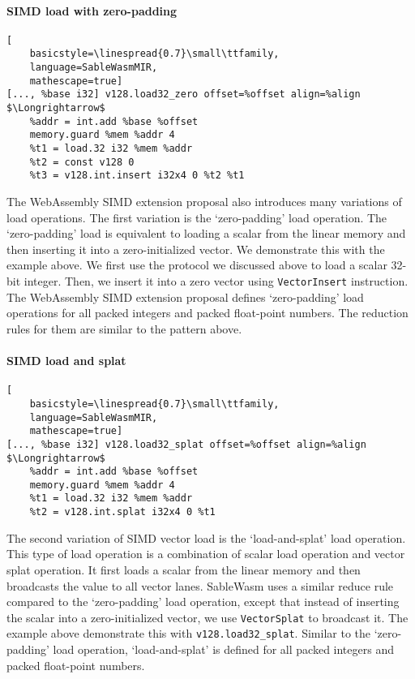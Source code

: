 \paragraph{SIMD load with zero-padding} \quad
\begin{lstlisting}[
    basicstyle=\linespread{0.7}\small\ttfamily, 
    language=SableWasmMIR, 
    mathescape=true]
[..., %base i32] v128.load32_zero offset=%offset align=%align $\Longrightarrow$
    %addr = int.add %base %offset
    memory.guard %mem %addr 4
    %t1 = load.32 i32 %mem %addr
    %t2 = const v128 0
    %t3 = v128.int.insert i32x4 0 %t2 %t1
\end{lstlisting}
The WebAssembly SIMD extension proposal also introduces many variations of load
operations. The first variation is the `zero-padding' load operation. The
`zero-padding' load is equivalent to loading a scalar from the linear memory and
then inserting it into a zero-initialized vector. We demonstrate this with the
example above. We first use the protocol we discussed above to load a scalar
32-bit integer. Then, we insert it into a zero vector using
\texttt{VectorInsert} instruction. The WebAssembly SIMD extension proposal
defines `zero-padding' load operations for all packed integers and
packed float-point numbers. The reduction rules for them are similar to the
pattern above.

\paragraph{SIMD load and splat} \quad
\begin{lstlisting}[
    basicstyle=\linespread{0.7}\small\ttfamily, 
    language=SableWasmMIR, 
    mathescape=true]
[..., %base i32] v128.load32_splat offset=%offset align=%align $\Longrightarrow$
    %addr = int.add %base %offset
    memory.guard %mem %addr 4
    %t1 = load.32 i32 %mem %addr
    %t2 = v128.int.splat i32x4 0 %t1
\end{lstlisting}
The second variation of SIMD vector load is the `load-and-splat' load operation.
This type of load operation is a combination of scalar load operation and vector
splat operation. It first loads a scalar from the linear memory and then
broadcasts the value to all vector lanes. SableWasm uses a similar reduce rule
compared to the `zero-padding' load operation, except that instead of inserting
the scalar into a zero-initialized vector, we use \texttt{VectorSplat} to
broadcast it. The example above demonstrate this with
\texttt{v128.load32\_splat}. Similar to the `zero-padding' load operation,
`load-and-splat' is defined for all packed integers and packed float-point
numbers.

